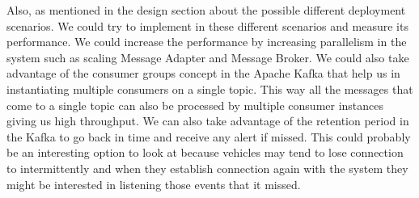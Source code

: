 Also, as mentioned in the design section about the possible different
deployment scenarios. We could try to implement \name{} in these
different scenarios and measure its performance. We could increase the
performance by increasing parallelism in the system such as scaling
Message Adapter and Message Broker. We could also take advantage of
the consumer groups concept in the Apache Kafka that help us in
instantiating multiple consumers on a single topic. This way all the
messages that come to a single topic can also be processed by multiple
consumer instances giving us high throughput. We can also take
advantage of the retention period in the Kafka to go back in time and
receive any alert if missed. This could probably be an interesting
option to look at because vehicles may tend to lose connection to
intermittently and when they establish connection again with the
system they might be interested in listening those events that it
missed.

